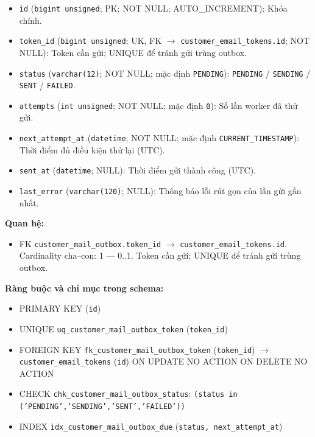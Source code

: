 \begin{itemize}

\item \texttt{id} (\texttt{bigint unsigned}; PK; NOT NULL; AUTO_INCREMENT): Khóa chính.

\item \texttt{token\_id} (\texttt{bigint unsigned}; UK, FK $\rightarrow$ \texttt{customer\_email\_tokens.id}; NOT NULL): Token cần gửi; UNIQUE để tránh gửi trùng outbox.

\item \texttt{status} (\texttt{varchar(12)}; NOT NULL; mặc định \texttt{PENDING}): \texttt{PENDING} / \texttt{SENDING} / \texttt{SENT} / \texttt{FAILED}.

\item \texttt{attempts} (\texttt{int unsigned}; NOT NULL; mặc định \texttt{0}): Số lần worker đã thử gửi.

\item \texttt{next\_attempt\_at} (\texttt{datetime}; NOT NULL; mặc định \texttt{CURRENT\_TIMESTAMP}): Thời điểm đủ điều kiện thử lại (UTC).

\item \texttt{sent\_at} (\texttt{datetime}; NULL): Thời điểm gửi thành công (UTC).

\item \texttt{last\_error} (\texttt{varchar(120)}; NULL): Thông báo lỗi rút gọn của lần gửi gần nhất.

\end{itemize}

\textbf{Quan hệ:}

\begin{itemize}

\item FK \texttt{customer\_mail\_outbox.token\_id} $\rightarrow$ \texttt{customer\_email\_tokens.id}. Cardinality cha--con: 1 — 0..1. Token cần gửi; UNIQUE để tránh gửi trùng outbox.

\end{itemize}

\textbf{Ràng buộc và chỉ mục trong schema:}

\begin{itemize}

\item PRIMARY KEY (\texttt{id})

\item UNIQUE \texttt{uq\_customer\_mail\_outbox\_token} (\texttt{token\_id})

\item FOREIGN KEY \texttt{fk\_customer\_mail\_outbox\_token} (\texttt{token\_id}) $\rightarrow$ \texttt{customer\_email\_tokens} (\texttt{id}) ON UPDATE NO ACTION ON DELETE NO ACTION

\item CHECK \texttt{chk\_customer\_mail\_outbox\_status}: \texttt{(status in ('PENDING','SENDING','SENT','FAILED'))}

\item INDEX \texttt{idx\_customer\_mail\_outbox\_due} (\texttt{status, next\_attempt\_at})

\end{itemize}

